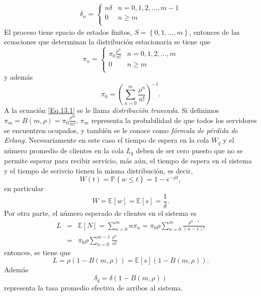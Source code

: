 \documentclass{article}
\newcommand{\esp}{\mathbb{E}}
\newcommand{\prob}{\mathbb{P}}
\numberwithin{equation}{section}
\begin{document}
\begin{eqnarray}
\delta_{n}=\left\{\begin{array}{cc}
n\delta & n=0,1,2,\ldots,m-1\\
0 & n\geq m\\
\end{array}
\right.
\end{eqnarray}
El proceso tiene epacio de estados finitos, $S=\left\{0,1,\ldots,m\right\}$, entonces de las ecuaciones que determinan la distribuci\'on estacionaria se tiene que
\begin{equation}\label{Eq.13.1}
\pi_{n}=\left\{\begin{array}{cc}
\pi_{0}\frac{\rho^{n}}{n!} & n=0,1,2,\ldots,m\\
0 & n\geq m\\
\end{array}
\right.
\end{equation}
y adem\'as
\begin{equation}
\pi_{0}=\left(\sum_{n=0}^{m}\frac{\rho^{n}}{n!}\right)^{-1}.
\end{equation}
A la ecuaci\'on \ref{Eq.13.1} se le llama {\em distribuci\'on truncada}. Si definimos
$\pi_{m}=B\left(m,\rho\right)=\pi_{0}\frac{\rho^{m}}{m!}$, $\pi_{m}$ representa la probabilidad de que todos los servidores se encuentren ocupados, y tambi\'en se le conoce como {\em f\'ormula de p\'erdida de Erlang}. Necesariamente en este caso el tiempo de espera en la cola $W_{q}$ y el n\'umero promedio de clientes en la cola $L_{q}$ deben de ser cero puesto que no se permite esperar para recibir servicio, m\'as a\'un, el tiempo de espera en el sistema y el tiempo de serivcio tienen la misma distribuci\'on, es decir,
\[W\left(t\right)=\prob\left\{w\leq t\right\}=1-e^{-\mu t},\] en particular
\[W=\esp\left[w\right]=\esp\left[s\right]=\frac{1}{\delta}.\]
Por otra parte, el n\'umero esperado de clientes en el sistema es
\begin{eqnarray*}
L&=&\esp\left[N\right]=\sum_{n=0}^{m}n\pi_{n}=\pi_{0}\rho\sum_{n=0}^{m}\frac{\rho^{n-1}}{\left(n-1\right)!}\\
&=&\pi_{0}\rho\sum_{n=0}^{m-1}\frac{\rho^{n}}{n!}
\end{eqnarray*}
entonces, se tiene que
\begin{equation}
L=\rho\left(1-B\left(m,\rho\right)\right)=\esp\left[s\right]\left(1-B\left(m,\rho\right)\right).
\end{equation}
Adem\'as
\begin{equation}
\delta_{q}=\delta\left(1-B\left(m,\rho\right)\right)
\end{equation}
representa la tasa promedio efectiva de arribos al sistema.
%
\end{document}
